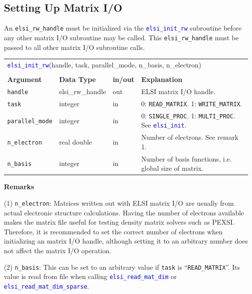 \documentclass{report}
\newcommand{\api}[1]{\textcolor{blue}{\texttt{#1}}}
\begin{document}
\subsection{Setting Up Matrix I/O}
\label{subsec:rw_init}
An \texttt{elsi\_rw\_handle} must be initialized via the \api{elsi\_init\_rw} subroutine before any other matrix I/O subroutine may be called. This \texttt{elsi\_rw\_handle} must be passed to all other matrix I/O subroutine calls.

\begin{tabular}[]{|p{25mm}|p{25mm}|p{10mm}|p{102mm}|}
\multicolumn{4}{l}{\api{elsi\_init\_rw}(handle, task, parallel\_mode, n\_basis, n\_electron)}\\
\multicolumn{4}{l}{}\\
\hline
\multicolumn{1}{|l|}{\textbf{Argument}} & \multicolumn{1}{l|}{\textbf{Data Type}} & \multicolumn{1}{l|}{\textbf{in/out}} & \multicolumn{1}{l|}{\textbf{Explanation}}\\
\hline
\texttt{handle}         & elsi\_rw\_handle & out & ELSI matrix I/O handle.\\
\hline
\texttt{task}           & integer          & in  & 0: \texttt{READ\_MATRIX}. 1: \texttt{WRITE\_MATRIX}.\\
\hline
\texttt{parallel\_mode} & integer          & in  & 0: \texttt{SINGLE\_PROC}. 1: \texttt{MULTI\_PROC}. See \api{elsi\_init}.\\
\hline
\texttt{n\_electron}    & real double      & in  & Number of electrons. See remark 1.\\
\hline
\texttt{n\_basis}       & integer          & in  & Number of basis functions, i.e. global size of matrix.\\
\hline
\end{tabular}

\textbf{Remarks}

(1) \texttt{n\_electron}: Matrices written out with ELSI matrix I/O are usually from actual electronic structure calculations. Having the number of electrons available makes the matrix file useful for testing density matrix solvers such as PEXSI. Therefore, it is recommended to set the correct number of electrons when initializing an matrix I/O handle, although setting it to an arbitrary number does not affect the matrix I/O operation.

(2) \texttt{n\_basis}: This can be set to an arbitrary value if \texttt{task} is ``\texttt{READ\_MATRIX}''. Its value is read from file when calling \api{elsi\_read\_mat\_dim} or \api{elsi\_read\_mat\_dim\_sparse}.
\end{document}
